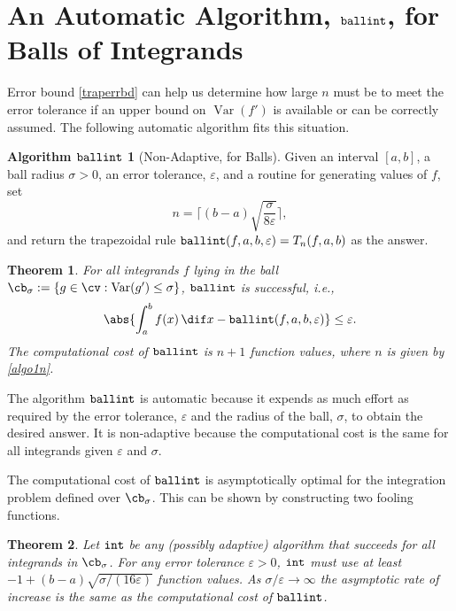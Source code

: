 \documentclass[]{article}
\DeclareMathOperator{\goodinteg}{\texttt{\textup{int}}}
\DeclareMathOperator{\ballinteg}{\texttt{\textup{ballint}}}
\DeclareMathOperator{\Var}{Var}
\newtheorem{theorem}{Theorem}
\theoremstyle{definition}
\newtheorem*{ballalgo}{Algorithm $\ballinteg$}
\theoremstyle{remark}
\begin{document}
\section{An Automatic Algorithm, $\ballinteg$, for Balls of Integrands} \label{autoballsec}

Error bound \eqref{traperrbd} can help us determine how large $n$ must be to meet the error tolerance if an upper bound on $\Var(f')$ is available or can be correctly assumed. The following automatic algorithm fits this situation.

\begin{ballalgo}[Non-Adaptive, for Balls] \label{ballalgo} Given an interval $[a,b]$, a ball radius $\sigma>0$, an error tolerance, $\varepsilon$, and a routine for generating values of $f$, set 
\begin{equation}\label{algo1n}
n = \Bigg \lceil (b-a)\sqrt{\frac{\sigma}{8\varepsilon}} \Bigg \rceil,
\end{equation}
and return the trapezoidal rule $\ballinteg(f,a,b,\varepsilon)=T_n(f,a,b)$ as the answer.
\end{ballalgo}
\begin{theorem} \label{ballalgothm} For all integrands $f$ lying in the ball $\cb_{\sigma} : =\{g \in \cv : \Var(g') \le \sigma\}$, $\ballinteg$ is successful, i.e., 
\[
\abs{\int_a^b f(x) \, \dif x - \ballinteg(f,a,b,\varepsilon)}\le \varepsilon.
\]
The computational cost of $\ballinteg$ is $n+1$ function values, where $n$ is given by \eqref{algo1n}.
\end{theorem}

The algorithm $\ballinteg$ is automatic because it expends as much effort as required by the error tolerance, $\varepsilon$ and the radius of the ball, $\sigma$, to obtain the desired answer.  It is non-adaptive because the computational cost is the same for all integrands given $\varepsilon$ and $\sigma$.

The computational cost of $\ballinteg$ is asymptotically optimal for the integration problem defined over $\cb_{\sigma}$.  This can be shown by constructing two fooling functions. 

\begin{theorem} \label{compcostballint}
Let $\goodinteg$ be any (possibly adaptive) algorithm that succeeds for all integrands in $\cb_{\sigma}$. For any error tolerance $\varepsilon>0$, $\goodinteg$ must use
at least $-1 +(b-a)\sqrt{\sigma/(16\varepsilon)}$ function values.  As $\sigma/\varepsilon \to \infty$ the asymptotic rate of increase is the same as the computational cost of $\ballinteg$.
\end{theorem}
\end{document}
